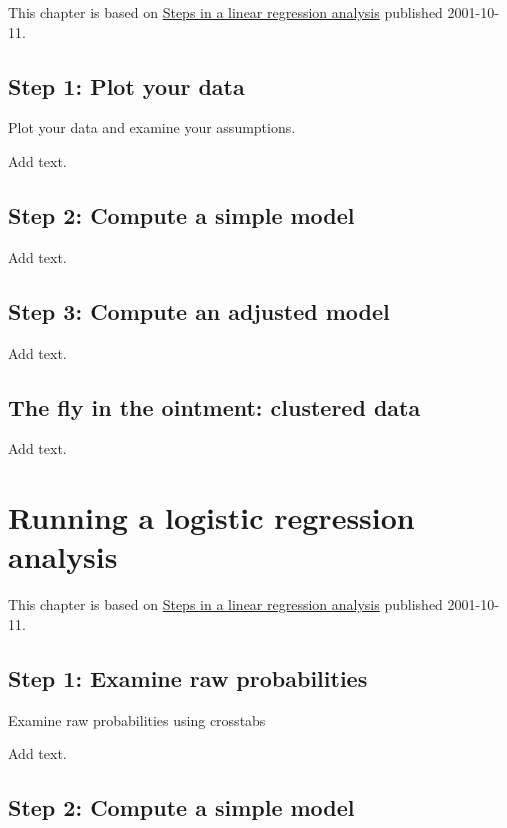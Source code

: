 \documentclass[
  letterpaper,
  DIV=11,
  numbers=noendperiod]{scrreprt}
\begin{document}
This chapter is based on
\href{http://new.pmean.com/steps-in-linear-regression/}{Steps in a
linear regression analysis} published 2001-10-11.

\section{Step 1: Plot your data}\label{step-1-plot-your-data}

Plot your data and examine your assumptions.

Add text.

\section{Step 2: Compute a simple
model}\label{step-2-compute-a-simple-model}

Add text.

\section{Step 3: Compute an adjusted
model}\label{step-3-compute-an-adjusted-model}

Add text.

\section{The fly in the ointment: clustered
data}\label{the-fly-in-the-ointment-clustered-data}

Add text.


\chapter{Running a logistic regression
analysis}\label{running-a-logistic-regression-analysis}

This chapter is based on
\href{http://new.pmean.com/steps-in-linear-regression/}{Steps in a
linear regression analysis} published 2001-10-11.

\section{Step 1: Examine raw
probabilities}\label{step-1-examine-raw-probabilities}

Examine raw probabilities using crosstabs

Add text.

\section{Step 2: Compute a simple
model}\label{step-2-compute-a-simple-model-1}
\end{document}
